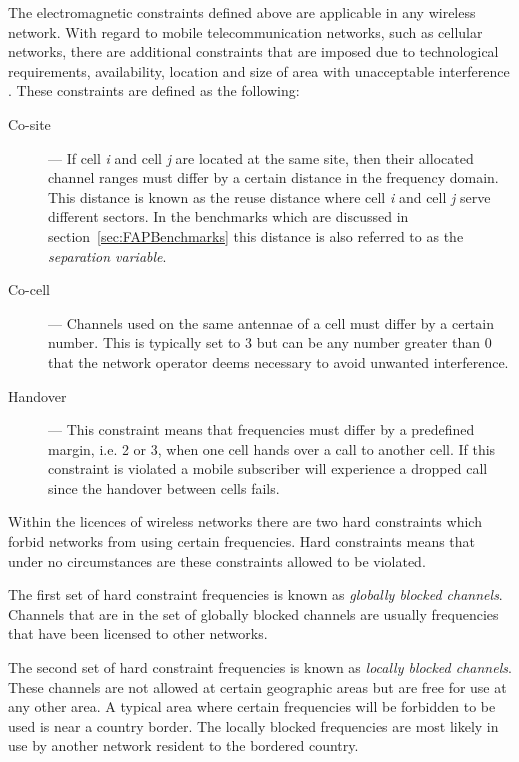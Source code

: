 The electromagnetic constraints defined above are applicable in any wireless network. With regard to mobile telecommunication networks, such as cellular networks, there are additional constraints that are imposed due to technological requirements, availability, location and size of area with unacceptable interference \cite{Karen2004,Eisenblatter,AndreasPaper}. These constraints are defined as the following:
\begin{description}
\item[Co-site] --- If cell \emph{i} and cell \emph{j} are located at the same site, then their allocated channel ranges must differ by a certain distance in the frequency domain. This distance is known as the reuse distance where cell \emph{i} and cell \emph{j} serve different sectors\cite{FixedFAPPSO,EgyptFAPPSO}. In the benchmarks which are discussed in section~\ref{sec:FAPBenchmarks} this distance is also referred to as the \emph{separation variable}. 
\item[Co-cell] --- Channels used on the same antennae of a cell must differ by a certain number. This is typically set to 3 but can be any number greater than 0 that the network operator deems necessary to avoid unwanted interference\cite{Karen2004,Eisenblatter,AndreasPaper}.
\item[Handover] --- This constraint means that frequencies must differ by a predefined margin, i.e. 2 or 3, when one cell hands over a call to another cell. If this constraint is violated a mobile subscriber will experience a dropped call since the handover between cells fails\cite{Karen2004,Eisenblatter,AndreasPaper}.
\end{description}

Within the licences of wireless networks there are two hard constraints which forbid networks from using certain frequencies. Hard constraints means that under no circumstances are these constraints allowed to be violated.

The first set of hard constraint frequencies is known as \emph{globally blocked channels}. Channels that are in the set of globally blocked channels are usually frequencies that have been licensed to other networks\cite{Karen2004,InterferenceOrientatedFAP}.

The second set of hard constraint frequencies is known as \emph{locally blocked channels}. These channels are not allowed at certain geographic areas but are free for use at any other area\cite{InterferenceOrientatedFAP}. A typical area where certain frequencies will be forbidden to be used is near a country border\cite{InterferenceOrientatedFAP}. The locally blocked frequencies are most likely in use by another network resident to the bordered country.

